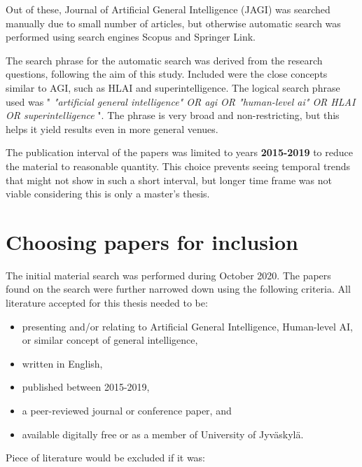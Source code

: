 \documentclass[utf8,english]{gradu3}
\begin{document}

Out of these, Journal of Artificial General
Intelligence (JAGI) was searched manually due to small number of articles, but
otherwise automatic search was performed using search engines Scopus and
Springer Link.

The search phrase for the automatic search was derived from the research
questions, following the aim of this study. Included were the close concepts
similar to AGI, such as HLAI and superintelligence. The logical search phrase
used was " \emph{"artificial general intelligence" OR agi OR "human-level ai" OR
HLAI OR superintelligence} ". The phrase is very broad and non-restricting, but
this helps it yield results even in more general venues.

The publication interval of the papers was limited to years \textbf{2015-2019}
to reduce the material to reasonable quantity. This choice prevents seeing
temporal trends that might not show in such a short interval, but longer time
frame was not viable considering this is only a master's thesis.

\section{Choosing papers for inclusion}

The initial material search was performed during October 2020. The papers found
on the search were further narrowed down using the following criteria. All
literature accepted for this thesis needed to be:

\begin{itemize}
  \item presenting and/or relating to Artificial General Intelligence,
        Human-level AI, or similar concept of general intelligence,
  \item written in English,
  \item published between 2015-2019,
  \item a peer-reviewed journal or conference paper, and
  \item available digitally free or as a member of University of Jyväskylä.
\end{itemize}

Piece of literature would be excluded if it was:
\end{document}
